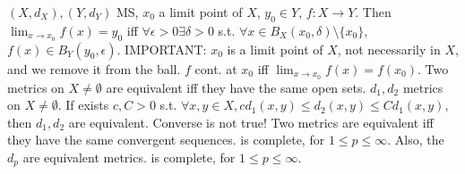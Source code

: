 $(X, d_X), (Y, d_Y)$ MS, $x_0$ a limit point of $X$, $y_0 \in Y$,
$f: X \to Y$. Then $\lim_{x \to x_0} f(x) = y_0$ iff
$\forall \epsilon > 0 \exists \delta > 0$ s.t.
$\forall x \in B_X(x_0, \delta) \setminus \{x_0\}$, $f(x) \in B_Y(y_0, \epsilon)$.
IMPORTANT: $x_0$ is a limit point of $X$, not necessarily in $X$, and we remove it from the ball.
 $f$ cont. at $x_0$ iff $\lim_{x \to x_0} f(x) = f(x_0)$.
 Two metrics on $X \neq \emptyset$ are equivalent iff
they have the same open sets.
 $d_1, d_2$ metrics on $X \neq \emptyset$.
If exists $c, C > 0$ s.t.
$\forall x,y \in X, c d_1(x,y) \leq d_2(x,y) \leq C d_1(x,y)$,
then $d_1, d_2$ are equivalent.
Converse is not true!
 Two metrics are equivalent iff they have the same convergent sequences.
 is complete, for $1 \leq p \leq \infty$.
Also, the $d_p$ are equivalent metrics.
 is complete, for $1 \leq p \leq \infty$.
